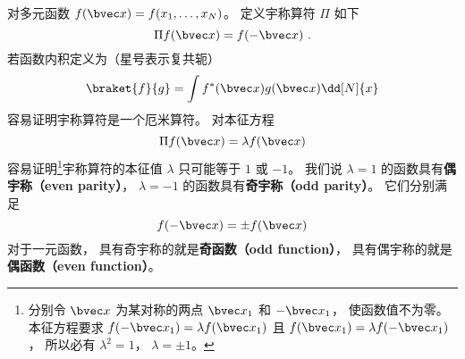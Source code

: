 

对多元函数 $f(\bvec x) = f(x_1, \dots, x_N)$。  定义宇称算符 $\Pi$ 如下
\begin{equation}
\Pi f(\bvec x) = f(-\bvec x)~.
\end{equation}
若函数内积定义为（星号表示复共轭）
\begin{equation}
\braket{f}{g} = \int f^*(\bvec x) g(\bvec x) \dd[N]{x}
\end{equation}
容易证明宇称算符是一个厄米算符。%
对本征方程
\begin{equation}
\Pi f(\bvec x) = \lambda f(\bvec x)
\end{equation}
容易证明\footnote{分别令 $\bvec x$ 为某对称的两点 $\bvec x_1$ 和 $-\bvec x_1$， 使函数值不为零。 本征方程要求 $f(-\bvec x_1) = \lambda f(\bvec x_1)$ 且 $f(\bvec x_1) = \lambda f(-\bvec x_1)$， 所以必有 $\lambda^2 = 1$， $\lambda = \pm 1$。}宇称算符的本征值 $\lambda$ 只可能等于 $1$ 或 $-1$。 我们说 $\lambda = 1$ 的函数具有\textbf{偶宇称（even parity）}， $\lambda = -1$ 的函数具有\textbf{奇宇称（odd parity）}。 它们分别满足
\begin{equation}
f(-\bvec x) = \pm f(\bvec x)
\end{equation}
对于一元函数， 具有奇宇称的就是\textbf{奇函数（odd function）}， 具有偶宇称的就是\textbf{偶函数（even function）}。
